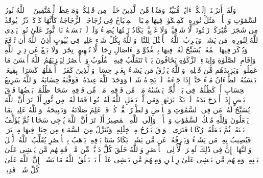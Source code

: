 \stopbuffer
\startbuffer[\q:24:34]
وَلَقَدۡ أَنزَلۡنَاۤ إِلَیۡكُمۡ ءَایَٰتࣲ مُّبَیِّنَٰتࣲ وَمَثَلࣰا مِّنَ ٱلَّذِینَ خَلَوۡا۟ مِن قَبۡلِكُمۡ وَمَوۡعِظَةࣰ لِّلۡمُتَّقِینَ%
\stopbuffer
\startbuffer[\q:24:35]
۞ ٱللَّهُ نُورُ ٱلسَّمَٰوَٰتِ وَٱلۡأَرۡضِۚ مَثَلُ نُورِهِۦ كَمِشۡكَوٰةࣲ فِیهَا مِصۡبَاحٌۖ ٱلۡمِصۡبَاحُ فِی زُجَاجَةٍۖ ٱلزُّجَاجَةُ كَأَنَّهَا كَوۡكَبࣱ دُرِّیࣱّ یُوقَدُ مِن شَجَرَةࣲ مُّبَٰرَكَةࣲ زَیۡتُونَةࣲ لَّا شَرۡقِیَّةࣲ وَلَا غَرۡبِیَّةࣲ یَكَادُ زَیۡتُهَا یُضِیۤءُ وَلَوۡ لَمۡ تَمۡسَسۡهُ نَارࣱۚ نُّورٌ عَلَىٰ نُورࣲۚ یَهۡدِی ٱللَّهُ لِنُورِهِۦ مَن یَشَاۤءُۚ وَیَضۡرِبُ ٱللَّهُ ٱلۡأَمۡثَٰلَ لِلنَّاسِۗ وَٱللَّهُ بِكُلِّ شَیۡءٍ عَلِیمࣱ%
\stopbuffer
\startbuffer[\q:24:36]
فِی بُیُوتٍ أَذِنَ ٱللَّهُ أَن تُرۡفَعَ وَیُذۡكَرَ فِیهَا ٱسۡمُهُۥ یُسَبِّحُ لَهُۥ فِیهَا بِٱلۡغُدُوِّ وَٱلۡءَاصَالِ%
\stopbuffer
\startbuffer[\q:24:37]
رِجَالࣱ لَّا تُلۡهِیهِمۡ تِجَٰرَةࣱ وَلَا بَیۡعٌ عَن ذِكۡرِ ٱللَّهِ وَإِقَامِ ٱلصَّلَوٰةِ وَإِیتَاۤءِ ٱلزَّكَوٰةِ یَخَافُونَ یَوۡمࣰا تَتَقَلَّبُ فِیهِ ٱلۡقُلُوبُ وَٱلۡأَبۡصَٰرُ%
\stopbuffer
\startbuffer[\q:24:38]
لِیَجۡزِیَهُمُ ٱللَّهُ أَحۡسَنَ مَا عَمِلُوا۟ وَیَزِیدَهُم مِّن فَضۡلِهِۦۗ وَٱللَّهُ یَرۡزُقُ مَن یَشَاۤءُ بِغَیۡرِ حِسَابࣲ%
\stopbuffer
\startbuffer[\q:24:39]
وَٱلَّذِینَ كَفَرُوۤا۟ أَعۡمَٰلُهُمۡ كَسَرَابِۭ بِقِیعَةࣲ یَحۡسَبُهُ ٱلظَّمۡءَانُ مَاۤءً حَتَّىٰۤ إِذَا جَاۤءَهُۥ لَمۡ یَجِدۡهُ شَیۡءࣰا وَوَجَدَ ٱللَّهَ عِندَهُۥ فَوَفَّىٰهُ حِسَابَهُۥۗ وَٱللَّهُ سَرِیعُ ٱلۡحِسَابِ%
\stopbuffer
\startbuffer[\q:24:40]
أَوۡ كَظُلُمَٰتࣲ فِی بَحۡرࣲ لُّجِّیࣲّ یَغۡشَىٰهُ مَوۡجࣱ مِّن فَوۡقِهِۦ مَوۡجࣱ مِّن فَوۡقِهِۦ سَحَابࣱۚ ظُلُمَٰتُۢ بَعۡضُهَا فَوۡقَ بَعۡضٍ إِذَاۤ أَخۡرَجَ یَدَهُۥ لَمۡ یَكَدۡ یَرَىٰهَاۗ وَمَن لَّمۡ یَجۡعَلِ ٱللَّهُ لَهُۥ نُورࣰا فَمَا لَهُۥ مِن نُّورٍ%
\stopbuffer
\startbuffer[\q:24:41]
أَلَمۡ تَرَ أَنَّ ٱللَّهَ یُسَبِّحُ لَهُۥ مَن فِی ٱلسَّمَٰوَٰتِ وَٱلۡأَرۡضِ وَٱلطَّیۡرُ صَٰۤفَّٰتࣲۖ كُلࣱّ قَدۡ عَلِمَ صَلَاتَهُۥ وَتَسۡبِیحَهُۥۗ وَٱللَّهُ عَلِیمُۢ بِمَا یَفۡعَلُونَ%
\stopbuffer
\startbuffer[\q:24:42]
وَلِلَّهِ مُلۡكُ ٱلسَّمَٰوَٰتِ وَٱلۡأَرۡضِۖ وَإِلَى ٱللَّهِ ٱلۡمَصِیرُ%
\stopbuffer
\startbuffer[\q:24:43]
أَلَمۡ تَرَ أَنَّ ٱللَّهَ یُزۡجِی سَحَابࣰا ثُمَّ یُؤَلِّفُ بَیۡنَهُۥ ثُمَّ یَجۡعَلُهُۥ رُكَامࣰا فَتَرَى ٱلۡوَدۡقَ یَخۡرُجُ مِنۡ خِلَٰلِهِۦ وَیُنَزِّلُ مِنَ ٱلسَّمَاۤءِ مِن جِبَالࣲ فِیهَا مِنۢ بَرَدࣲ فَیُصِیبُ بِهِۦ مَن یَشَاۤءُ وَیَصۡرِفُهُۥ عَن مَّن یَشَاۤءُۖ یَكَادُ سَنَا بَرۡقِهِۦ یَذۡهَبُ بِٱلۡأَبۡصَٰرِ%
\stopbuffer
\startbuffer[\q:24:44]
یُقَلِّبُ ٱللَّهُ ٱلَّیۡلَ وَٱلنَّهَارَۚ إِنَّ فِی ذَٰلِكَ لَعِبۡرَةࣰ لِّأُو۟لِی ٱلۡأَبۡصَٰرِ%
\stopbuffer
\startbuffer[\q:24:45]
وَٱللَّهُ خَلَقَ كُلَّ دَاۤبَّةࣲ مِّن مَّاۤءࣲۖ فَمِنۡهُم مَّن یَمۡشِی عَلَىٰ بَطۡنِهِۦ وَمِنۡهُم مَّن یَمۡشِی عَلَىٰ رِجۡلَیۡنِ وَمِنۡهُم مَّن یَمۡشِی عَلَىٰۤ أَرۡبَعࣲۚ یَخۡلُقُ ٱللَّهُ مَا یَشَاۤءُۚ إِنَّ ٱللَّهَ عَلَىٰ كُلِّ شَیۡءࣲ قَدِیرࣱ%
